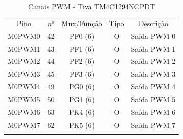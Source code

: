 \begin{center}
	\begin{longtable}{|c|c|c|c|c|}
		\rowcolor[HTML]{000000}
		{\color[HTML]{FFFFFF} Pino} & {\color[HTML]{FFFFFF} $n^{o}$} & {\color[HTML]{FFFFFF} Mux/Função} & {\color[HTML]{FFFFFF} Tipo} & {\color[HTML]{FFFFFF} Descrição}            \\
		M0PWM0    & 42  & PF0 (6) & O & Saída PWM 0\\
		M0PWM1    & 43  & PF1 (6) & O & Saída PWM 1\\
		M0PWM2    & 44  & PF2 (6) & O & Saída PWM 2\\
		M0PWM3    & 45  & PF3 (6) & O & Saída PWM 3\\
		M0PWM4    & 49  & PG0 (6) & O & Saída PWM 4\\
		M0PWM5    & 50  & PG1 (6) & O & Saída PWM 5\\
		M0PWM6    & 63  & PK4 (6) & O & Saída PWM 6\\
		M0PWM7    & 62  & PK5 (6) & O & Saída PWM 7\\
		\hline
		\caption{Canais PWM - Tiva TM4C1294NCPDT \cite{DATASHEET_TIVA} }
		\label{tab:CanaisPWM}
	\end{longtable}
\end{center}